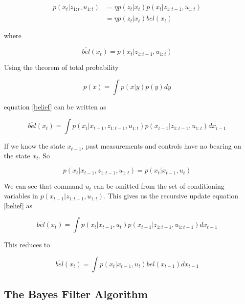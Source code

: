 \documentclass[conference]{IEEEtran}
\begin{document}
\begin{equation}\label{MoreSimplTargPost}
\begin{aligned}
p(x_t|z_{1:t},u_{1:t}) &= \eta p(z_t|x_t) p(x_t|z_{1:t-1}, u_{1:t})\\
&= \eta p(z_t|x_t) \overline{bel}(x_t)
\end{aligned}
\end{equation}

where

\begin{equation}\label{belief}
\overline{bel}(x_t) = p(x_t|z_{1:t-1}, u_{1:t})
\end{equation}

Using the theorem of total probability

\begin{equation}
p(x) = \int p(x|y) p(y) dy
\end{equation}

equation \ref{belief} can be written as 

\begin{equation}
\overline{bel}(x_t) = \int p(x_t|x_{t-1}, z_{1:t-1}, u_{1:t}) p(x_{t-1}|z_{1:t-1}, u_{1:t}) dx_{t-1}
\end{equation}

If we know the state $x_{t-1}$, past measurements and controls have no bearing on the state $x_t$. So

\begin{equation}
p(x_t|x_{t-1}, z_{1:t-1}, u_{1:t}) = p(x_t|x_{t-1}, u_t)
\end{equation}

We can see that command $u_t$ can be omitted from the set of conditioning variables in $p(x_{t-1}|z_{1:t-1}, u_{1:t})$. This gives us the recursive update equation \ref{belief} as

\begin{equation}
\overline{bel}(x_t) = \int p(x_t|x_{t-1}, u_t) p(x_{t-1}|z_{1:t-1}, u_{1:t-1}) dx_{t-1}
\end{equation}

This reduces to

\begin{equation}
\overline{bel}(x_t) = \int p(x_t|x_{t-1}, u_t) bel(x_{t-1}) dx_{t-1}
\end{equation}

\subsection{The Bayes Filter Algorithm}
\end{document}
